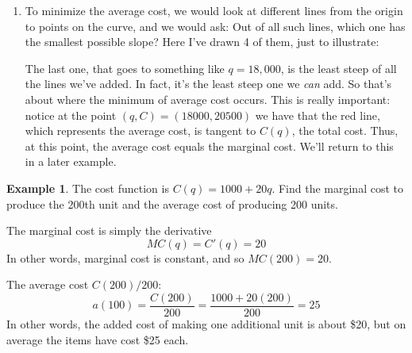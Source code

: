\documentclass[oneside]{book}
\theoremstyle{definition}
\newtheorem{example}{Example}
\theoremstyle{solution}
\newtheorem*{solution}{Solution}
\newenvironment{solution}{\vspace{2in}\comment}{\endcomment}
\begin{document}
\begin{solution}
\begin{enumerate}
\item To minimize the average cost, we would look at different lines
  from the origin to points on the curve, and we would ask: Out of all
  such lines, which one has the smallest possible slope?  Here I've
  drawn 4 of them, just to illustrate:
\begin{center}
\end{center}
The last one, that goes to something like $q=18,000$, is the least
steep of all the lines we've added.  In fact, it's the least steep one
we \emph{can} add.  So that's about where the minimum of average cost
occurs.  This is really important: notice at the point
$(q,C) = (18000, 20500)$ we have that the red line, which represents
the average cost, is tangent to $C(q)$, the total cost.  Thus, at this
point, the average cost equals the marginal cost. We'll return to this
in a later example.
\end{enumerate}
\end{solution}

\begin{example}
  The cost function is $C(q) = 1000 + 20q$. Find the marginal cost to
  produce the 200th unit and the average cost of producing 200 units.
\end{example}

\begin{solution}
The marginal cost is simply the derivative
$$
MC(q) = C'(q) = 20
$$
In other words, marginal cost is constant, and so $MC(200)=20$.

The average cost $C(200)/200$:
$$
a(100) = \frac{C(200)}{200} = \frac{1000+20(200)}{200} = 25
$$
In other words, the added cost of making one additional unit is about
\$20, but on average the items have cost \$25 each.
\end{solution}
\end{document}
